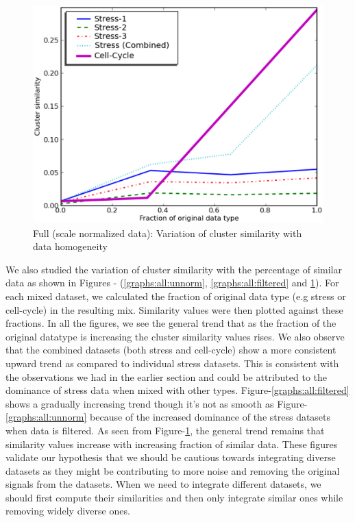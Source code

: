 \begin{figure}[p]\centering
\includegraphics[scale=0.35]{chapter1/plot_norm.eps}
\caption{Full (scale normalized data): Variation of cluster similarity with data homogeneity}
\label{graphs:all:norm}
\end{figure}

We also studied the variation of cluster similarity with the percentage of similar data as shown in Figures - (\ref{graphs:all:unnorm}, \ref{graphs:all:filtered} and \ref{graphs:all:norm}). For each mixed dataset, we calculated the fraction of original data type (e.g stress or cell-cycle) in the resulting mix. Similarity values were then plotted against these fractions. In all the figures, we see the general trend that as the fraction of the original datatype is increasing the cluster similarity values rises. We also observe that the combined datasets (both stress and cell-cycle) show a more consistent upward trend as compared to individual stress datasets. This is consistent with the observations we had in the earlier section and could be attributed to the dominance of stress data when mixed with other types. Figure-\ref{graphs:all:filtered} 
shows a gradually increasing trend though it's not as smooth as Figure-\ref{graphs:all:unnorm} because of the increased dominance of the stress datasets when data is filtered. As seen from Figure-\ref{graphs:all:norm}, the general trend remains that similarity values increase with increasing fraction of similar data. These figures validate our hypothesis that we should be cautious towards integrating diverse datasets as they might be contributing to more noise and removing the original signals from the datasets. When we need to integrate different datasets, we should first compute their similarities and then only integrate similar ones while removing widely diverse ones.
